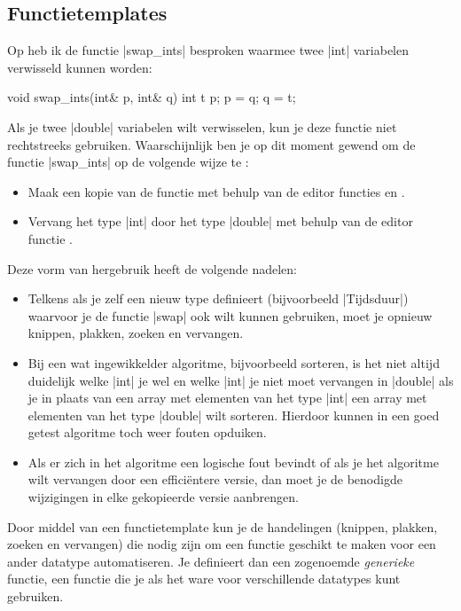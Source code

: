 \begin{cpplstShortInline}
\section{Functietemplates}
\label{sec:functietemplate}
Op  heb ik de functie |swap_ints| besproken waarmee twee |int| variabelen verwisseld kunnen worden:
\begin{cpplstfragment}
void swap_ints(int& p, int& q) {
    int t {p};
    p = q;
    q = t;
}
\end{cpplstfragment}

Als je twee |double| variabelen wilt verwisselen, kun je deze functie niet rechtstreeks gebruiken.
Waarschijnlijk ben je op dit moment gewend om de functie |swap_ints| op de volgende wijze te :
\begin{itemize}
    \item Maak een kopie van de functie met behulp van de editor functies  en .
    \item Vervang het type |int| door het type |double| met behulp van de editor functie .
\end{itemize}
Deze vorm van hergebruik heeft de volgende nadelen:
\begin{itemize}
    \item Telkens als je zelf een nieuw type definieert (bijvoorbeeld |Tijdsduur|) waarvoor je de functie |swap| ook wilt kunnen gebruiken, moet je opnieuw knippen, plakken, zoeken en vervangen.
    \item Bij een wat ingewikkelder algoritme, bijvoorbeeld sorteren, is het niet altijd duidelijk welke |int| je wel en welke |int| je niet moet vervangen in |double| als je in plaats van een array met elementen van het type |int| een array met elementen van het type |double| wilt sorteren. Hierdoor kunnen in een goed getest algoritme toch weer fouten opduiken.
    \item Als er zich in het algoritme een logische fout bevindt of als je het algoritme wilt vervangen door een efficiëntere versie, dan moet je de benodigde wijzigingen in elke gekopieerde versie aanbrengen.
\end{itemize}
Door middel van een functietemplate kun je de handelingen (knippen, plakken, zoeken en vervangen) die nodig zijn om een functie geschikt te maken voor een ander datatype automatiseren.
Je definieert dan een zogenoemde \emph{generieke} functie, een functie die je als het ware voor verschillende datatypes kunt gebruiken.


\end{cpplstShortInline}
